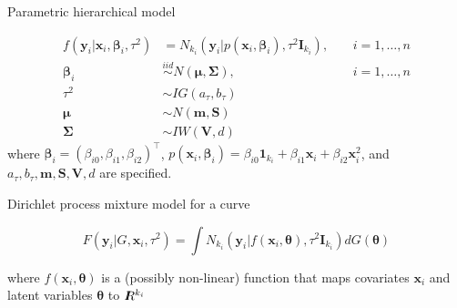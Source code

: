 \documentclass[serif, 12pt, t]{beamer}
\newcommand{\m}[1]{\mathbf{\bm{#1}}}
\newcommand{\R}{I\hspace{-4.4pt}R}
\renewcommand{\frametitle}[1]{\vspace{0.14cm}\hspace{-0.70cm}\textcolor{col2}{%
    \Large{#1}}\vspace{0.15cm}\newline}
\begin{document}
\begin{frame}
\frametitle{Parametric hierarchical model}

\begin{align*}
f(\m{y}_i|\m{x}_i,\m{\beta}_i,\tau^2) &= N_{k_i}(\m{y}_i|p(\m{x}_i, \m{\beta}_i), \tau^2\m{I}_{k_i}),~~~~~&i=1,\ldots,n \\
\m{\beta}_i &\overset{iid}\sim N(\m{\mu}, \m{\Sigma}),~~~~~&i=1,\ldots,n \\
\tau^2 &\sim IG(a_\tau, b_\tau) \\
\m{\mu} &\sim N(\m{m}, \m{S}) \\
\m{\Sigma} &\sim IW(\m{V}, d) 
\end{align*}
where $\m{\beta}_i=(\beta_{i0}, \beta_{i1}, \beta_{i2})^\top$, $p(\m{x}_i,\m{\beta}_i) = \beta_{i0}\m{1}_{k_i} + \beta_{i1}\m{x}_i + \beta_{i2}\m{x}_i^2$, and $a_\tau, b_\tau, \m{m}, \m{S}, \m{V}, d$ are specified.

\end{frame}


\begin{frame}
\frametitle{Dirichlet process mixture model for a curve}

\[ F(\m{y}_i|G,\m{x}_i, \tau^2) = \int N_{k_i}(\m{y}_i|f(\m{x}_i, \m{\theta}), \tau^2\m{I}_{k_i})dG(\m{\theta}) \]

where $f(\m{x}_i, \m{\theta})$ is a (possibly non-linear) function that maps covariates $\m{x}_i$ and latent variables $\m{\theta}$ to $\R^{k_i}$



\end{frame}
\end{document}
